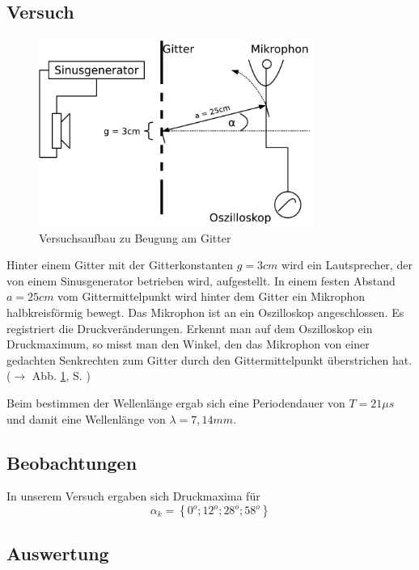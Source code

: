 		\subsection{Versuch}


\begin{figure}
   \centering
   \includegraphics[width=0.8\textwidth]{praktika/mat_praktika/gitter}
   \caption{Versuchsaufbau zu Beugung am Gitter}
   \label{img_aufbau_gitter}
\end{figure}



Hinter einem Gitter mit der Gitterkonstanten \(g = 3cm\) wird ein Lautsprecher, der von einem Sinusgenerator betrieben wird, aufgestellt. In einem festen Abstand \(a = 25cm\) vom Gittermittelpunkt wird hinter dem Gitter ein Mikrophon halbkreisförmig bewegt. Das Mikrophon ist an ein Oszilloskop angeschlossen. Es registriert die Druckveränderungen. Erkennt man auf dem Oszilloskop ein Druckmaximum, so misst man den Winkel, den das Mikrophon von einer gedachten Senkrechten zum Gitter durch den Gittermittelpunkt überstrichen hat.
(\(\rightarrow\) Abb. \ref{img_aufbau_gitter}, S. \pageref{img_aufbau_gitter})

Beim bestimmen der Wellenlänge ergab sich eine Periodendauer von \(T = 21 \mu s\) und damit eine Wellenlänge von \(\lambda = 7,14mm\).



		\subsection{Beobachtungen}

In unserem Versuch ergaben sich Druckmaxima für 
\[
   \alpha_k = \left \{ 0^o; 12^o; 28^o; 58^o \right \}
\]




		\subsection{Auswertung}


